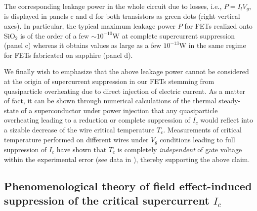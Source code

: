 \documentclass[prl,twocolumn,reprint,graphicx,showpacs,superscriptaddress,floatfix]{revtex4-1}
\begin{document}
The corresponding  leakage power in the whole circuit due to losses, i.e.,  $P=I_lV_g$, is displayed in panels c and d for both transistors  as green dots (right vertical axes). 
In particular, the typical maximum leakage power $P$ for FETs realized onto SiO$_2$ is of the order of a few  $\sim 10^{-10}$W at complete supercurrent suppression (panel c) whereas it obtains values as large as a few $10^{-13}$W in the same regime for FETs fabricated on sapphire (panel d).

We finally wish  to emphasize that the above leakage power cannot be considered at the origin of supercurrent suppression in our FETs stemming from quasiparticle overheating due to direct injection of electric  current.  
As a matter of fact,  it can be shown through numerical calculations of the thermal steady-state of a superconductor under power injection that any quasiparticle overheating leading to a reduction or complete suppression of $I_c$ would reflect into a sizable decrease of the wire critical temperature $T_c$. 
Measurements of critical temperature  performed on different wires under $V_g
$  conditions leading to full suppression of $I_c$ have shown that $T_c$ is completely \emph{independent} of gate voltage  within the experimental error (see data in \cite{Paolucci2018}), thereby supporting the above claim. 






\subsection{Phenomenological theory of field effect-induced suppression of the critical supercurrent $I_c$}
\end{document}
